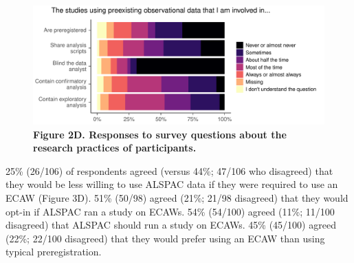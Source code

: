 \documentclass[
  man,floatsintext]{apa6}
\begin{document}
\begin{figure}[H]

{\centering \includegraphics[width=1\linewidth]{figs/methodPlotAll-1} 

}

\caption{\textbf{Figure 2D. Responses to survey questions about the research practices of participants.}}\label{fig:methodPlotAll}
\end{figure}

{\smaller[1]
\begin{singlespace}



\end{singlespace}
}

25\% (26/106) of respondents agreed (versus 44\%; 47/106 who disagreed) that they would be less willing to use ALSPAC data if they were required to use an ECAW (Figure 3D). 51\% (50/98) agreed (21\%; 21/98 disagreed) that they would opt-in if ALSPAC ran a study on ECAWs. 54\% (54/100) agreed (11\%; 11/100 disagreed) that ALSPAC should run a study on ECAWs. 45\% (45/100) agreed (22\%; 22/100 disagreed) that they would prefer using an ECAW than using typical preregistration.
\end{document}
